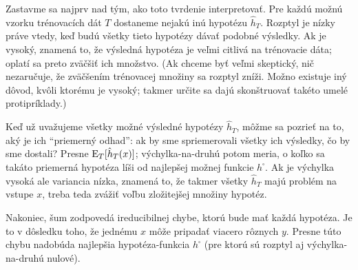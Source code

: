 Zastavme sa najprv nad tým, ako toto tvrdenie interpretovať. Pre každú
možnú vzorku trénovacích dát $T$ dostaneme nejakú inú hypotézu $\hat{h}_T$.
Rozptyl je nízky práve vtedy, keď budú všetky tieto hypotézy dávať
podobné výsledky. Ak je vysoký, znamená to, že výsledná hypotéza je
veľmi citlivá na trénovacie dáta; oplatí sa preto zväčšiť ich množstvo.
(Ak chceme byť veľmi skeptický, nič nezaručuje, že zväčšením trénovacej
množiny sa rozptyl zníži. Možno existuje iný dôvod, kvôli ktorému je
vysoký; takmer určite sa dajú skonštruovať takéto umelé protipríklady.)

Keď už uvažujeme všetky možné výsledné hypotézy $\hat{h}_T$, môžme sa
pozrieť na to, aký je ich ``priemerný odhad'': ak by sme spriemerovali
všetky ich výsledky, čo by sme dostali? Presne $\operatorname*{\mathrm{E}}_T [ \hat{h}_T(x) ]$;
výchylka-na-druhú potom meria, o koľko sa takáto priemerná hypotéza líši od
najlepšej možnej funkcie $h^\square$. Ak je výchylka vysoká ale variancia
nízka, znamená to, že takmer všetky $\hat{h}_T$ majú problém na vstupe $x$,
treba teda zvážiť voľbu zložitejšej množiny hypotéz.

Nakoniec, šum zodpovedá ireducibilnej chybe, ktorú bude mať každá hypotéza.
Je to v dôsledku toho, že jednému $x$ môže pripadať viacero rôznych $y$.
Presne túto chybu nadobúda najlepšia hypotéza-funkcia $h^\square$ (pre
ktorú sú rozptyl aj výchylka-na-druhú nulové).

